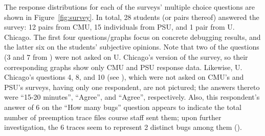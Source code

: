 
The response distributions for each of the surveys' multiple choice questions
are shown in Figure~\ref{fig:survey}.
In total, 28 students (or pairs thereof) answered the survey:
12 pairs from CMU, 15 individuals from PSU, and 1 pair from U. Chicago.
The first four questions/graphs focus on concrete debugging results,
and the latter six on the students' subjective opinions.
%
Note that two of the questions
(3 and 7 from \sect{\ref{sec:education-survey-pebbles}})
were not asked on U. Chicago's version of the survey,
so their corresponding graphs show only CMU and PSU response data.
Likewise, U. Chicago's questions 4, 8, and 10
(see \sect{\ref{sec:education-survey-pintos}}),
which were not asked on CMU's and PSU's surveys,
having only one respondent,
are not pictured;
the answers thereto were ``15-20 minutes'', ``Agree'', and ``Agree'', respectively.
Also, this respondent's answer of 6 on the ``How many bugs'' question
appears to indicate the total number of preemption trace files course staff sent them;
upon further investigation,
the 6 traces seem to represent 2 distinct bugs among them (\sect{\ref{sec:education-eval-bugs-uc}}).

